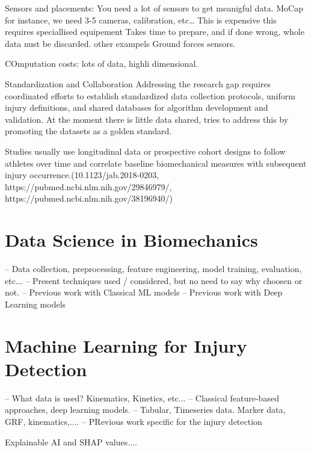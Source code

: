 Sensors and placements: You need a lot of sensors to get meanigful data. MoCap for instance, we need 3-5 cameras, calibration, etc\dots
This is expensive
this requires speciallised equipement
Takes time to prepare, and if done wrong, whole data nust be discarded.
other exampels Ground forces sensors.


COmputation costs: lots of data, highli dimensional.

Standardization and Collaboration
Addressing the research gap requires coordinated efforts to establish standardized data collection protocols, uniform injury definitions, and shared databases for algorithm development and validation. At the moment there is little data shared, \citet{Ferber2024} tries to address this by promoting the datasets as a golden standard.


Studies usually use longitudinal data or prospective cohort designs to follow athletes over time and correlate baseline biomechanical measures with subsequent injury occurrence.(10.1123/jab.2018-0203, https://pubmed.ncbi.nlm.nih.gov/29846979/, https://pubmed.ncbi.nlm.nih.gov/38196940/)

\section{Data Science in Biomechanics}\label{sec:sota-data-science}
-- Data collection, preprocessing, feature engineering, model training, evaluation, etc...
-- Present techniques used / considered, but no need to say why choosen or not.
-- Previous work with Classical ML models
-- Previous work with Deep Learning models

\section{Machine Learning for Injury Detection}\label{sec:sota-ml-injury-detection}
-- What data is used? Kinematics, Kinetics, etc...
-- Classical feature-based approaches, deep learning models.
-- Tabular, Timeseries data. Marker data, GRF, kinematics,....
-- PRevious work specific for the injury detection

\cite{Dibbern2025} Explainable AI and SHAP values....

